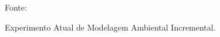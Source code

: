 \documentclass[xcolor=dvipsnames, aspectratio=169]{beamer}
\begin{document}
\begin{frame}
\begin{itemize}
      \begin{figure}
        \centering
        {Fonte: \cite{buniyamin2011simple}}
        \caption{Experimento Atual de Modelagem Ambiental Incremental.}
        \label{fig:9}
      \end{figure}

  \end{itemize}
\end{frame}

\begin{frame}
    \printbibliography
\end{frame}


\begin{frame}
\titlepage %
\end{frame}
\end{document}
